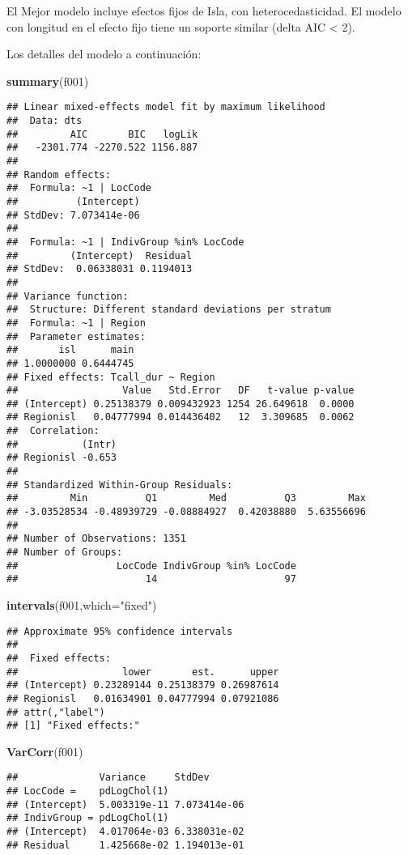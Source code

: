 \documentclass[]{article}
\newenvironment{Shaded}{\begin{snugshade}}{\end{snugshade}}
\newcommand{\DataTypeTok}[1]{\textcolor[rgb]{0.13,0.29,0.53}{#1}}
\newcommand{\KeywordTok}[1]{\textcolor[rgb]{0.13,0.29,0.53}{\textbf{#1}}}
\newcommand{\NormalTok}[1]{#1}
\newcommand{\StringTok}[1]{\textcolor[rgb]{0.31,0.60,0.02}{#1}}
\begin{document}
El Mejor modelo incluye efectos fijos de Isla, con heterocedasticidad.
El modelo con longitud en el efecto fijo tiene un soporte similar (delta
AIC \textless{} 2).

Los detalles del modelo a continuación:

\begin{Shaded}
\begin{Highlighting}[]
\KeywordTok{summary}\NormalTok{(f001)}
\end{Highlighting}
\end{Shaded}

\begin{verbatim}
## Linear mixed-effects model fit by maximum likelihood
##  Data: dts 
##         AIC       BIC   logLik
##   -2301.774 -2270.522 1156.887
## 
## Random effects:
##  Formula: ~1 | LocCode
##          (Intercept)
## StdDev: 7.073414e-06
## 
##  Formula: ~1 | IndivGroup %in% LocCode
##         (Intercept)  Residual
## StdDev:  0.06338031 0.1194013
## 
## Variance function:
##  Structure: Different standard deviations per stratum
##  Formula: ~1 | Region 
##  Parameter estimates:
##       isl      main 
## 1.0000000 0.6444745 
## Fixed effects: Tcall_dur ~ Region 
##                  Value   Std.Error   DF   t-value p-value
## (Intercept) 0.25138379 0.009432923 1254 26.649618  0.0000
## Regionisl   0.04777994 0.014436402   12  3.309685  0.0062
##  Correlation: 
##           (Intr)
## Regionisl -0.653
## 
## Standardized Within-Group Residuals:
##         Min          Q1         Med          Q3         Max 
## -3.03528534 -0.48939729 -0.08884927  0.42038880  5.63556696 
## 
## Number of Observations: 1351
## Number of Groups: 
##                 LocCode IndivGroup %in% LocCode 
##                      14                      97
\end{verbatim}

\begin{Shaded}
\begin{Highlighting}[]
\KeywordTok{intervals}\NormalTok{(f001,}\DataTypeTok{which=}\StringTok{"fixed"}\NormalTok{)}
\end{Highlighting}
\end{Shaded}

\begin{verbatim}
## Approximate 95% confidence intervals
## 
##  Fixed effects:
##                  lower       est.      upper
## (Intercept) 0.23289144 0.25138379 0.26987614
## Regionisl   0.01634901 0.04777994 0.07921086
## attr(,"label")
## [1] "Fixed effects:"
\end{verbatim}

\begin{Shaded}
\begin{Highlighting}[]
\KeywordTok{VarCorr}\NormalTok{(f001)}
\end{Highlighting}
\end{Shaded}

\begin{verbatim}
##              Variance     StdDev      
## LocCode =    pdLogChol(1)             
## (Intercept)  5.003319e-11 7.073414e-06
## IndivGroup = pdLogChol(1)             
## (Intercept)  4.017064e-03 6.338031e-02
## Residual     1.425668e-02 1.194013e-01
\end{verbatim}
\end{document}
